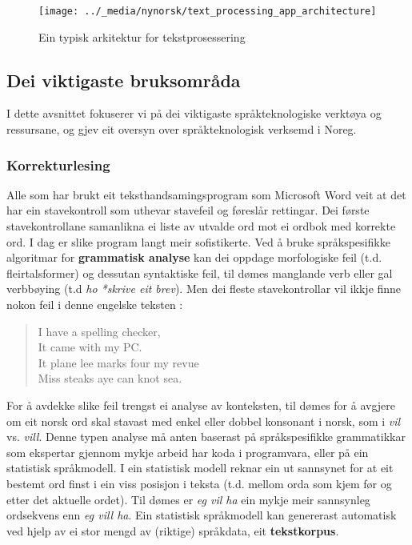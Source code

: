 \begin{multicols}{2}
\begin{figure*}[htb]
  \center
  \texttt{[image: ../\_media/nynorsk/text\_processing\_app\_architecture]}
  \caption{Ein typisk arkitektur for tekstprosessering}
  \label{fig:textprocessingarch_no}
\end{figure*}

\subsection{Dei viktigaste bruksområda}

I dette avsnittet fokuserer vi på dei viktigaste språkteknologiske verktøya og ressursane, og gjev eit oversyn over språkteknologisk verksemd i Noreg.  %

\subsubsection{Korrekturlesing}

Alle som har brukt eit teksthandsamingsprogram som Microsoft Word veit at det har ein stavekontroll som uthevar stavefeil og føreslår rettingar. Dei første stavekontrollane samanlikna ei liste av utvalde ord mot ei ordbok med korrekte ord. I dag er slike program langt meir sofistikerte. Ved å bruke språkspesifikke algoritmar for \textbf{grammatisk analyse} kan dei oppdage morfologiske feil (t.d. fleirtalsformer) og dessutan syntaktiske feil, til dømes manglande verb eller gal verbbøying (t.d \textit{ho *skrive eit brev}). Men dei fleste stavekontrollar vil ikkje finne nokon feil i denne engelske teksten \cite{zar1}:
 
\begin{quote}
  I have a spelling checker,\\
  It came with my PC.\\
  It plane lee marks four my revue\\
  Miss steaks aye can knot sea.
\end{quote}

For å avdekke slike feil trengst ei analyse av konteksten, til dømes for å avgjere om eit norsk ord skal stavast med enkel eller dobbel konsonant i norsk, som i \textit{vil} vs. \textit{vill}.
Denne typen analyse må anten baserast på språkspesifikke grammatikkar som ekspertar gjennom mykje arbeid har koda i programvara, eller på ein statistisk språkmodell. 
I ein statistisk modell reknar ein ut sannsynet for at eit bestemt ord finst i ein viss posisjon i teksta (t.d. mellom orda som kjem før og etter det aktuelle ordet). Til dømes er \textit{eg vil ha} ein mykje meir sannsynleg ordsekvens enn \textit{eg vill ha}. Ein statistisk språkmodell kan genererast automatisk ved hjelp av ei stor mengd av (riktige) språkdata, eit \textbf{tekstkorpus}. 


\end{multicols}
